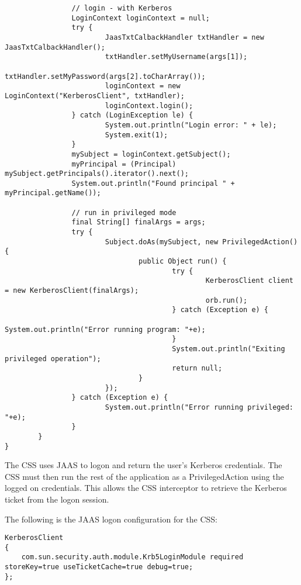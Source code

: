 \begin{scriptsize}
\begin{verbatim}
                // login - with Kerberos
                LoginContext loginContext = null;
                try {
                        JaasTxtCalbackHandler txtHandler = new JaasTxtCalbackHandler();
                        txtHandler.setMyUsername(args[1]);
                        txtHandler.setMyPassword(args[2].toCharArray());
                        loginContext = new LoginContext("KerberosClient", txtHandler);
                        loginContext.login();
                } catch (LoginException le) {
                        System.out.println("Login error: " + le);
                        System.exit(1);
                }
                mySubject = loginContext.getSubject();
                myPrincipal = (Principal) mySubject.getPrincipals().iterator().next();
                System.out.println("Found principal " + myPrincipal.getName());

                // run in privileged mode
                final String[] finalArgs = args;
                try {
                        Subject.doAs(mySubject, new PrivilegedAction() {
                                public Object run() {
                                        try {
                                                KerberosClient client = new KerberosClient(finalArgs);
                                                orb.run();
                                        } catch (Exception e) {
                                                System.out.println("Error running program: "+e);
                                        }
                                        System.out.println("Exiting privileged operation");
                                        return null;
                                }
                        });
                } catch (Exception e) {
                        System.out.println("Error running privileged: "+e);
                }
        }
}
\end{verbatim}
\end{scriptsize}

The CSS uses JAAS to logon and return the user's Kerberos credentials.
The CSS must then run the rest of the application as a PrivilegedAction using
the logged on credentials. This allows the CSS interceptor to retrieve the
Kerberos ticket from the logon session.

The following is the JAAS logon configuration for the CSS:

\begin{scriptsize}
\begin{verbatim}
KerberosClient 
{
    com.sun.security.auth.module.Krb5LoginModule required storeKey=true useTicketCache=true debug=true;
};
\end{verbatim}
\end{scriptsize}



